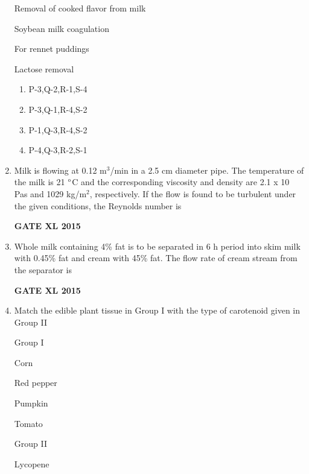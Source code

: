 \documentclass[journal,12pt,onecolumn]{IEEEtran}
\begin{document}
\begin{enumerate}
\begin{minipage}{0.5\textwidth}
\begin{flushleft}
 Removal of cooked flavor from milk

 Soybean milk coagulation

 For rennet puddings

 Lactose removal
	\end{flushleft}

	\end{minipage}

    \begin{enumerate}
            \item P-3,Q-2,R-1,S-4
            \item P-3,Q-1,R-4,S-2
            \item P-1,Q-3,R-4,S-2
            \item P-4,Q-3,R-2,S-1
    \end{enumerate}
\item Milk is flowing at 0.12 m$^3$/min in a 2.5 cm diameter pipe. The temperature of the milk is 21 $\degree$C and the corresponding viscosity and density are 2.1 x 10 Pas and 1029 kg/m$^2$, respectively. If the flow is found to be turbulent under the given conditions, the Reynolds number is
\begin{flushright}\textbf{GATE XL 2015}\end{flushright}
\item Whole milk  containing 4\% fat is to be separated in 6 h period into skim milk with 0.45\% fat and cream with 45\% fat. The flow rate of cream stream  from the separator is
\begin{flushright}\textbf{GATE XL 2015}\end{flushright}
\item Match the edible plant tissue in Group I with the type of carotenoid given in Group II

	\begin{minipage}{0.5\textwidth}\begin{flushleft}
Group I

 Corn

 Red pepper

 Pumpkin

 Tomato 
	\end{flushleft}
	\end{minipage}
	\begin{minipage}{0.5\textwidth}\begin{flushleft}
Group II

 Lycopene


\end{flushleft}
\end{minipage}
\end{enumerate}
\end{document}
